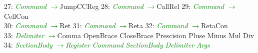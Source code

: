 \documentclass[a0]{a0poster}
\begin{document}
27: \textcolor{Green}{\textit{Command}} \textcolor{Green}{$\to$}JumpCCReg 28: \textcolor{Green}{\textit{Command}} \textcolor{Green}{$\to$}CallRel 29: \textcolor{Green}{\textit{Command}} \textcolor{Green}{$\to$}CellCon \\
30: \textcolor{Green}{\textit{Command}} \textcolor{Green}{$\to$}Ret 31: \textcolor{Green}{\textit{Command}} \textcolor{Green}{$\to$}Reta 32: \textcolor{Green}{\textit{Command}} \textcolor{Green}{$\to$}RetaCon \\
33: \textcolor{Green}{\textit{Delimiter}} \textcolor{Green}{$\to$}Comma OpenBrace CloseBrace Prescision Pluse Minus Mul Div 34: \textcolor{Green}{\textit{SectionBody}} \textcolor{Green}{$\to$}\textcolor{Green}{\textit{Register}} \textcolor{Green}{\textit{Command}} \textcolor{Green}{\textit{SectionBody}} \textcolor{Green}{\textit{Delimiter}} \textcolor{Green}{\textit{Args}}  
\end{document}
